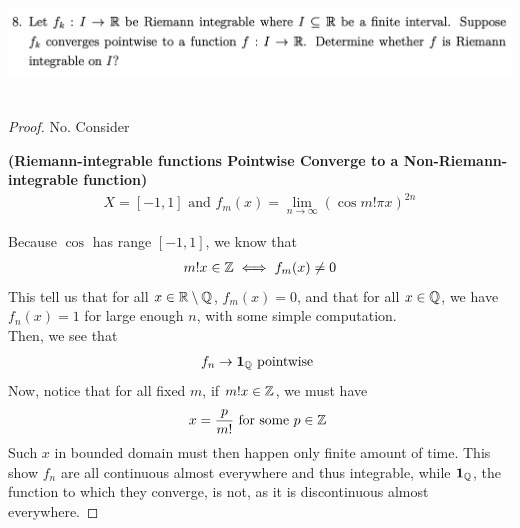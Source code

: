 \documentclass{report}
\begin{document}
\begin{question}{}{}
\includegraphics[height=3cm,width=18cm]{ahw21}
\end{question}
\begin{proof}
No. Consider 
\begin{Example}{\textbf{(Riemann-integrable functions Pointwise Converge to a Non-Riemann-integrable function)}}{}
\begin{align*}
X=[-1,1]\text{ and }f_m(x)=\lim_{n\to \infty} (\cos m! \pi x)^{2n}
\end{align*}
\end{Example}
Because $\cos$ has range $[-1,1]$, we know that 
\begin{align*}
m!x \in\mathbb{Z} \iff  f_m(x)\neq 0
\end{align*}
This tell us that for all $x\in\mathbb{R}\setminus \mathbb{Q}$, $f_m(x)=0$, and that for all $x\in\mathbb{Q}$, we have $f_n(x)=1$ for large enough $n$, with some simple computation.\\

Then, we see that 
\begin{align*}
f_n \to \textbf{1}_{\mathbb{Q}}\text{ pointwise }
\end{align*}
Now, notice that for all fixed $m$, if  $m!x\in\mathbb{Z}$, we must have 
\begin{align*}
x=\frac{p}{m!}\text{ for some $p\in\mathbb{Z}$ }
\end{align*}
Such $x$ in bounded domain must then happen only finite amount of time. This show  $f_n$ are all continuous almost everywhere and thus integrable, while $\textbf{1}_{\mathbb{Q}}$, the function to which they converge, is not, as it is discontinuous almost everywhere.  
\end{proof}
\end{document}
